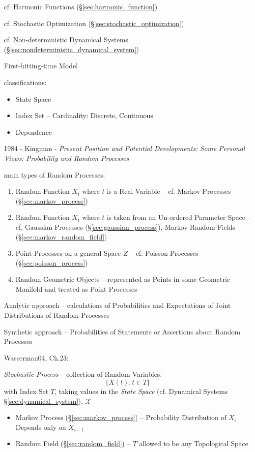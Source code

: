 cf. Harmonic Functions (\S\ref{sec:harmonic_function})

\fist cf. Stochastic Optimization (\S\ref{sec:stochastic_optimization})

\fist cf. Non-deterministic Dynamical Systems
(\S\ref{sec:nondeterministic_dynamical_system})

First-hitting-time Model

classifications:

\begin{itemize}
  \item State Space
  \item Index Set -- Cardinality: Discrete, Continuous
  \item Dependence
\end{itemize}

1984 - Kingman - \emph{Present Position and Potential Developments: Some
  Personal Views: Probability and Random Processes}

main types of Random Processes:
\begin{enumerate}
  \item Random Function $X_t$ where $t$ is a Real Variable -- cf. Markov
    Processes (\S\ref{sec:markov_process})
  \item Random Function $X_t$ where $t$ is taken from an Un-ordered Parameter
    Space -- cf. Gaussian Processes (\S\ref{sec:gaussian_process}), Markov
    Random Fields (\S\ref{sec:markov_random_field})
  \item Point Processes on a general Space $Z$ -- cf. Poisson Processes
    (\S\ref{sec:poisson_process})
  \item Random Geometric Objects -- represented as Points in some Geometric
    Manifold and treated as Point Processes
\end{enumerate}

Analytic approach -- calculations of Probabilities and Expectations of Joint
Distributions of Random Processes

Synthetic approach -- Probabilities of Statements or Assertions about Random
Processes

Wasserman04, Ch.23:

\emph{Stochastic Process} -- collection of Random Variables:
\[
  \{ X(t) : t \in T \}
\]
with Index Set $T$, taking values in the \emph{State Space} (cf. Dynamical
Systems \S\ref{sec:dynamical_system}), $\mathcal{X}$

\begin{itemize}
  \item Markov Process (\S\ref{sec:markov_process}) -- Probability Distribution
    of $X_i$ Depends only on $X_{i-1}$
  \item Random Field (\S\ref{sec:random_field}) -- $T$ allowed to be any
    Topological Space
\end{itemize}

